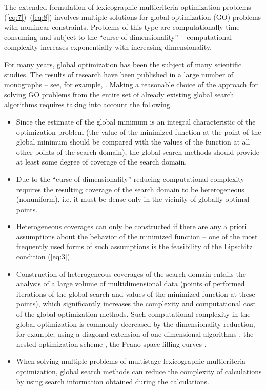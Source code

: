 \documentclass[smallextended]{svjour3}       %
\begin{document}
The extended formulation of lexicographic multicriteria optimization problems (\ref{eq:7})--(\ref{eq:8}) involves multiple solutions for global optimization (GO) problems with nonlinear constraints. Problems of this type are computationally time-consuming and subject to the ``curse of dimensionality'' -- computational complexity increases exponentially with increasing dimensionality.

For many years, global optimization has been the subject of many scientific studies. The results of research have been published in a large number of monographs -- see, for example, \cite{c17,c18,c19,c20,c21,c22,c23,c24,c25}. Making a reasonable choice of the approach for solving GO problems from the entire set of already existing global search algorithms requires taking into account the following.
\begin{itemize}
	\item Since the estimate of the global minimum is an integral characteristic of the optimization problem (the value of the minimized function at the point of the global minimum should be compared with the values of the function at all other points of the search domain), the global search methods should provide at least some degree of coverage of the search domain.
	\item Due to the ``curse of dimensionality'' reducing computational complexity requires the resulting coverage of the search domain to be heterogeneous (nonuniform), i.e. it must be dense only in the vicinity of globally optimal points.
	\item Heterogeneous coverages can only be constructed if there are any a priori assumptions about the behavior of the minimized function -- one of the most frequently used forms of such assumptions is the feasibility of the Lipschitz condition (\ref{eq:3}).
	\item Construction of heterogeneous coverages of the search domain entails the analysis of a large volume of multidimensional data (points of performed iterations of the global search and values of the minimized function at these points), which significantly increases the complexity and computational cost of the global optimization methods. Such computational complexity in the global optimization is commonly decreased by the dimensionality reduction, for example, using a diagonal extension of one-dimensional algorithms \cite{c22,c45}, the nested optimization scheme \cite{c46,c47,Grishagin2016_1,Grishagin2019}, the Peano space-filling curves \cite{c17,c23}.
	\item When solving multiple problems of multistage lexicographic multicriteria optimization, global search methods can reduce the complexity of calculations by using search information obtained during the calculations.
\end{itemize}
\end{document}
